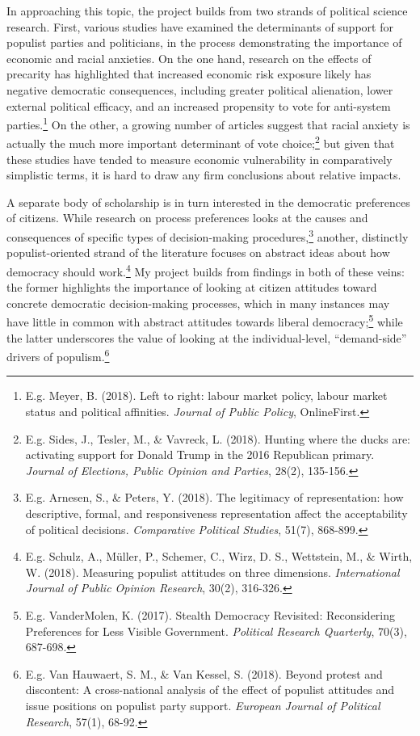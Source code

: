 \documentclass[fontsize=10.5pt,letterpaper]{scrartcl}
\begin{document}
In approaching this topic, the project builds from two strands of political science research. First, various studies have examined the determinants of support for populist parties and politicians, in the process demonstrating the importance of economic and racial anxieties. On the one hand, research on the effects of precarity has highlighted that increased economic risk exposure likely has negative democratic consequences, including greater political alienation, lower external political efficacy, and an increased propensity to vote for anti-system parties.\footnote{E.g. Meyer, B. (2018). Left to right: labour market policy, labour market status and political affinities. \textit{Journal of Public Policy}, OnlineFirst.} On the other, a growing number of articles suggest that racial anxiety is actually the much more important determinant of vote choice;\footnote{E.g. Sides, J., Tesler, M., \& Vavreck, L. (2018). Hunting where the ducks are: activating support for Donald Trump in the 2016 Republican primary. \textit{Journal of Elections, Public Opinion and Parties}, 28(2), 135-156.} but given that these studies have tended to measure economic vulnerability in comparatively simplistic terms, it is hard to draw any firm conclusions about relative impacts.

A separate body of scholarship is in turn interested in the democratic preferences of citizens. While research on process preferences looks at the causes and consequences of specific types of decision-making procedures,\footnote{E.g. Arnesen, S., \& Peters, Y. (2018). The legitimacy of representation: how descriptive, formal, and responsiveness representation affect the acceptability of political decisions. \textit{Comparative Political Studies}, 51(7), 868-899.} another, distinctly populist-oriented strand of the literature focuses on abstract ideas about how democracy should work.\footnote{E.g. Schulz, A., Müller, P., Schemer, C., Wirz, D. S., Wettstein, M., \& Wirth, W. (2018). Measuring populist attitudes on three dimensions. \textit{International Journal of Public Opinion Research}, 30(2), 316-326.} My project builds from findings in both of these veins: the former highlights the importance of looking at citizen attitudes toward concrete democratic decision-making processes, which in many instances may have little in common with abstract attitudes towards liberal democracy;\footnote{E.g. VanderMolen, K. (2017). Stealth Democracy Revisited: Reconsidering Preferences for Less Visible Government. \textit{Political Research Quarterly}, 70(3), 687-698.} while the latter underscores the value of looking at the individual-level, “demand-side” drivers of populism.\footnote{E.g. Van Hauwaert, S. M., \& Van Kessel, S. (2018). Beyond protest and discontent: A cross-national analysis of the effect of populist attitudes and issue positions on populist party support. \textit{European Journal of Political Research}, 57(1), 68-92.}
\end{document}
